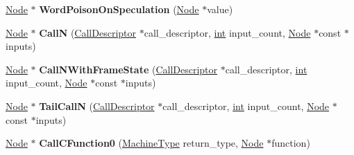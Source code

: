 \begin{DoxyCompactItemize}
\mbox{\hyperlink{classv8_1_1internal_1_1compiler_1_1Node}{Node}} $\ast$ {\bfseries Word\+Poison\+On\+Speculation} (\mbox{\hyperlink{classv8_1_1internal_1_1compiler_1_1Node}{Node}} $\ast$value)
\item 
\mbox{\label{classv8_1_1internal_1_1compiler_1_1RawMachineAssembler_af362630ad4ce521763618e922c296084}} 
\mbox{\hyperlink{classv8_1_1internal_1_1compiler_1_1Node}{Node}} $\ast$ {\bfseries CallN} (\mbox{\hyperlink{classv8_1_1internal_1_1compiler_1_1CallDescriptor}{Call\+Descriptor}} $\ast$call\+\_\+descriptor, \mbox{\hyperlink{classint}{int}} input\+\_\+count, \mbox{\hyperlink{classv8_1_1internal_1_1compiler_1_1Node}{Node}} $\ast$const $\ast$inputs)
\item 
\mbox{\label{classv8_1_1internal_1_1compiler_1_1RawMachineAssembler_a975581880aa318395b774a57d85123bb}} 
\mbox{\hyperlink{classv8_1_1internal_1_1compiler_1_1Node}{Node}} $\ast$ {\bfseries Call\+N\+With\+Frame\+State} (\mbox{\hyperlink{classv8_1_1internal_1_1compiler_1_1CallDescriptor}{Call\+Descriptor}} $\ast$call\+\_\+descriptor, \mbox{\hyperlink{classint}{int}} input\+\_\+count, \mbox{\hyperlink{classv8_1_1internal_1_1compiler_1_1Node}{Node}} $\ast$const $\ast$inputs)
\item 
\mbox{\label{classv8_1_1internal_1_1compiler_1_1RawMachineAssembler_a4fcc61173bcee23840de6ab534c32e40}} 
\mbox{\hyperlink{classv8_1_1internal_1_1compiler_1_1Node}{Node}} $\ast$ {\bfseries Tail\+CallN} (\mbox{\hyperlink{classv8_1_1internal_1_1compiler_1_1CallDescriptor}{Call\+Descriptor}} $\ast$call\+\_\+descriptor, \mbox{\hyperlink{classint}{int}} input\+\_\+count, \mbox{\hyperlink{classv8_1_1internal_1_1compiler_1_1Node}{Node}} $\ast$const $\ast$inputs)
\item 
\mbox{\label{classv8_1_1internal_1_1compiler_1_1RawMachineAssembler_aac2ced7c532b7b077841c5c9e40afd6f}} 
\mbox{\hyperlink{classv8_1_1internal_1_1compiler_1_1Node}{Node}} $\ast$ {\bfseries Call\+C\+Function0} (\mbox{\hyperlink{classv8_1_1internal_1_1MachineType}{Machine\+Type}} return\+\_\+type, \mbox{\hyperlink{classv8_1_1internal_1_1compiler_1_1Node}{Node}} $\ast$function)
\item 

\end{DoxyCompactItemize}
